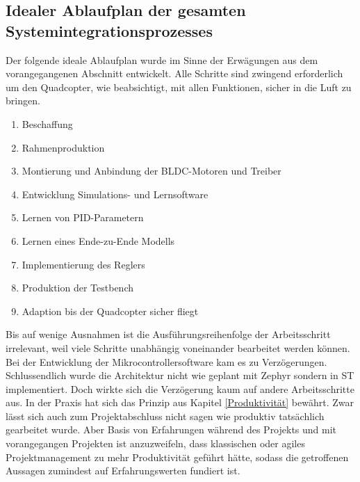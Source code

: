 \subsection{Idealer Ablaufplan der gesamten Systemintegrationsprozesses}
Der folgende ideale Ablaufplan wurde im Sinne der Erwägungen aus dem vorangegangenen Abschnitt entwickelt. Alle Schritte sind zwingend erforderlich um den Quadcopter, wie beabsichtigt, mit allen Funktionen, sicher in die Luft zu bringen.
\begin{enumerate} 
	\item Beschaffung
    \item Rahmenproduktion
    \item Montierung und Anbindung der BLDC-Motoren und Treiber
    \item Entwicklung Simulations- und Lernsoftware
    \item Lernen von PID-Parametern
    \item Lernen eines Ende-zu-Ende Modells
    \item Implementierung des Reglers
    \item Produktion der Testbench
    \item Adaption bis der Quadcopter sicher fliegt 
\end{enumerate} 
Bis auf wenige Ausnahmen ist die Ausführungsreihenfolge der Arbeitsschritt irrelevant, weil viele Schritte unabhängig voneinander bearbeitet werden können.\\
Bei der Entwicklung der Mikrocontrollersoftware kam es zu Verzögerungen. Schlussendlich wurde die Architektur nicht wie geplant mit Zephyr sondern in ST implementiert. Doch wirkte sich die Verzögerung kaum auf andere Arbeitsschritte aus. In der Praxis hat sich das Prinzip aus Kapitel \ref{Produktivität} bewährt. Zwar lässt sich auch zum Projektabschluss nicht sagen wie produktiv tatsächlich gearbeitet wurde. Aber Basis von Erfahrungen während des Projekts und mit vorangegangen Projekten ist anzuzweifeln, dass klassischen oder agiles Projektmanagement zu mehr Produktivität geführt hätte, sodass die getroffenen Aussagen zumindest auf Erfahrungswerten fundiert ist.

